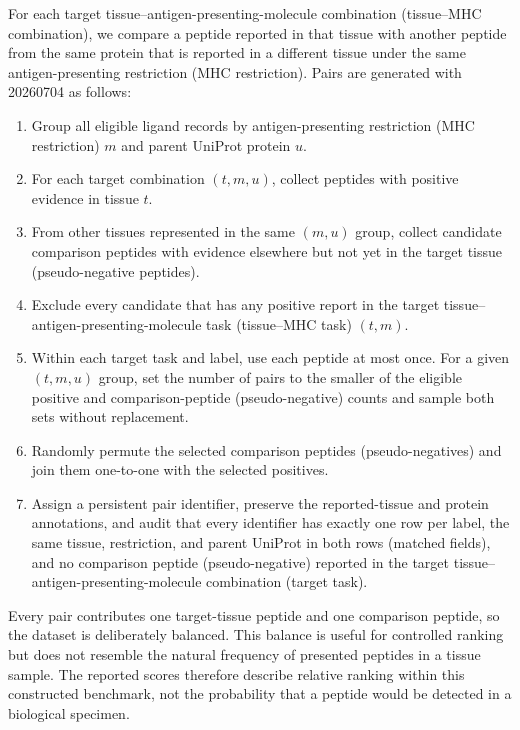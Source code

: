 For each target tissue--antigen-presenting-molecule combination (tissue--MHC combination), we compare a peptide reported in that tissue with another peptide from the same protein that is reported in a different tissue under the same antigen-presenting restriction (MHC restriction). Pairs are generated with \plainSplitSeed{} 20260704 as follows:

\begin{enumerate}
    \item Group all eligible ligand records by antigen-presenting restriction (MHC restriction) \(m\) and parent UniProt protein \(u\).
    \item For each target combination \((t,m,u)\), collect peptides with positive evidence in tissue \(t\).
    \item From other tissues represented in the same \((m,u)\) group, collect candidate comparison peptides with evidence elsewhere but not yet in the target tissue (pseudo-negative peptides).
    \item Exclude every candidate that has any positive report in the target tissue--antigen-presenting-molecule task (tissue--MHC task) \((t,m)\).
    \item Within each target task and label, use each peptide at most once. For a given \((t,m,u)\) group, set the number of pairs to the smaller of the eligible positive and comparison-peptide (pseudo-negative) counts and sample both sets without replacement.
    \item Randomly permute the selected comparison peptides (pseudo-negatives) and join them one-to-one with the selected positives.
    \item Assign a persistent pair identifier, preserve the reported-tissue and protein annotations, and audit that every identifier has exactly one row per label, the same tissue, restriction, and parent UniProt in both rows (matched fields), and no comparison peptide (pseudo-negative) reported in the target tissue--antigen-presenting-molecule combination (target task).
\end{enumerate}

Every pair contributes one target-tissue peptide and one comparison peptide, so the dataset is deliberately balanced. This balance is useful for controlled ranking but does not resemble the natural frequency of presented peptides in a tissue sample. The reported scores therefore describe relative ranking within this constructed benchmark, not the probability that a peptide would be detected in a biological specimen.

